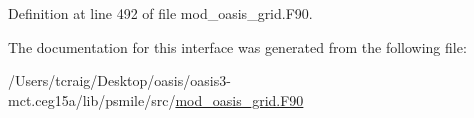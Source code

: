 Definition at line 492 of file mod\+\_\+oasis\+\_\+grid.\+F90.



The documentation for this interface was generated from the following file\+:\begin{DoxyCompactItemize}
\item 
/\+Users/tcraig/\+Desktop/oasis/oasis3-\/mct.\+ceg15a/lib/psmile/src/\hyperlink{mod__oasis__grid_8_f90}{mod\+\_\+oasis\+\_\+grid.\+F90}\end{DoxyCompactItemize}
